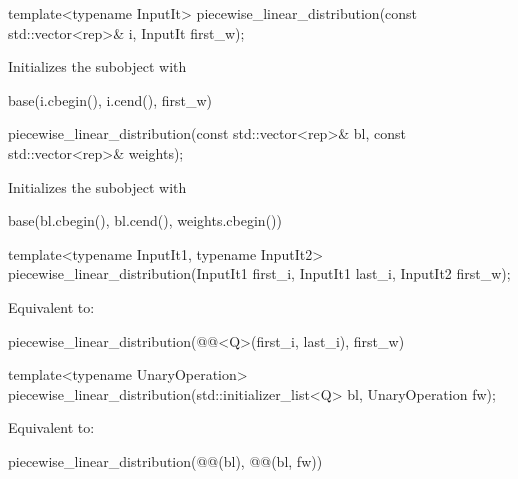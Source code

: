 \begin{itemdecl}
template<typename InputIt>
piecewise_linear_distribution(const std::vector<rep>& i, InputIt first_w);
\end{itemdecl}

\begin{itemdescr}
\pnum
\effects
Initializes the  subobject with
\begin{codeblock}
base(i.cbegin(), i.cend(), first_w)
\end{codeblock}
\end{itemdescr}

\begin{itemdecl}
piecewise_linear_distribution(const std::vector<rep>& bl, const std::vector<rep>& weights);
\end{itemdecl}

\begin{itemdescr}
\pnum
\effects
Initializes the  subobject with
\begin{codeblock}
base(bl.cbegin(), bl.cend(), weights.cbegin())
\end{codeblock}
\end{itemdescr}

\begin{itemdecl}
template<typename InputIt1, typename InputIt2>
piecewise_linear_distribution(InputIt1 first_i, InputIt1 last_i, InputIt2 first_w);
\end{itemdecl}

\begin{itemdescr}
\pnum
\effects
Equivalent to:
\begin{codeblock}
piecewise_linear_distribution(@@<Q>(first_i, last_i), first_w)
\end{codeblock}
\end{itemdescr}

\begin{itemdecl}
template<typename UnaryOperation>
piecewise_linear_distribution(std::initializer_list<Q> bl, UnaryOperation fw);
\end{itemdecl}

\begin{itemdescr}
\pnum
\effects
Equivalent to:
\begin{codeblock}
piecewise_linear_distribution(@@(bl), @@(bl, fw))
\end{codeblock}
\end{itemdescr}

